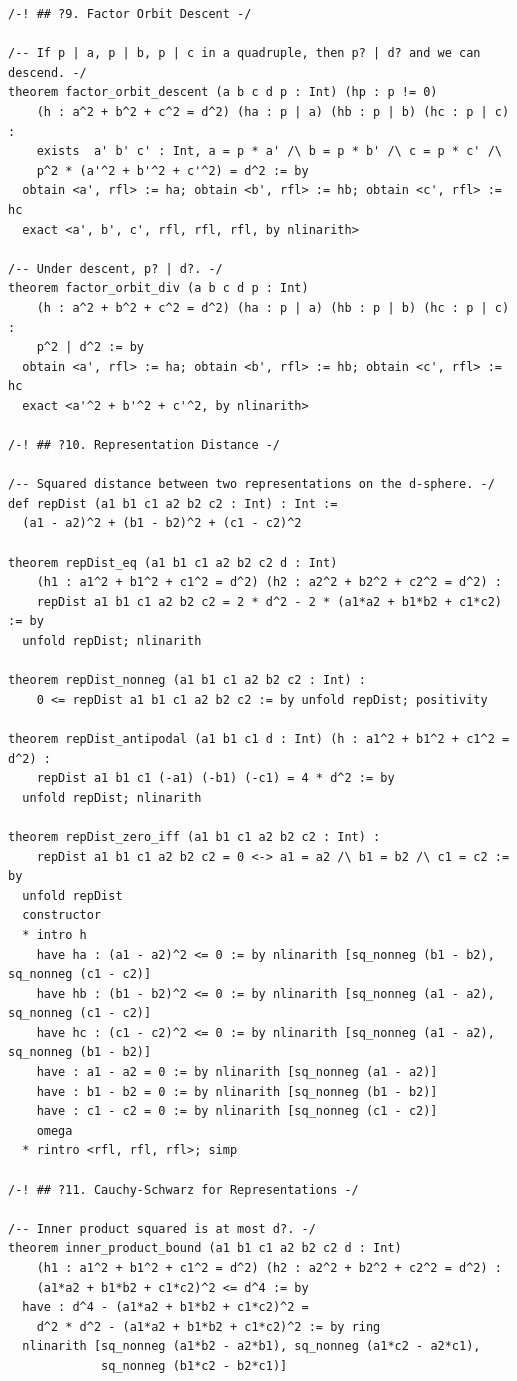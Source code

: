 \documentclass[11pt,twoside,openright]{book}
\theoremstyle{definition}
\theoremstyle{remark}
\begin{document}
\begin{lstlisting}[style=lean]
/-! ## ?9. Factor Orbit Descent -/

/-- If p | a, p | b, p | c in a quadruple, then p? | d? and we can descend. -/
theorem factor_orbit_descent (a b c d p : Int) (hp : p != 0)
    (h : a^2 + b^2 + c^2 = d^2) (ha : p | a) (hb : p | b) (hc : p | c) :
    exists  a' b' c' : Int, a = p * a' /\ b = p * b' /\ c = p * c' /\
    p^2 * (a'^2 + b'^2 + c'^2) = d^2 := by
  obtain <a', rfl> := ha; obtain <b', rfl> := hb; obtain <c', rfl> := hc
  exact <a', b', c', rfl, rfl, rfl, by nlinarith>

/-- Under descent, p? | d?. -/
theorem factor_orbit_div (a b c d p : Int)
    (h : a^2 + b^2 + c^2 = d^2) (ha : p | a) (hb : p | b) (hc : p | c) :
    p^2 | d^2 := by
  obtain <a', rfl> := ha; obtain <b', rfl> := hb; obtain <c', rfl> := hc
  exact <a'^2 + b'^2 + c'^2, by nlinarith>

/-! ## ?10. Representation Distance -/

/-- Squared distance between two representations on the d-sphere. -/
def repDist (a1 b1 c1 a2 b2 c2 : Int) : Int :=
  (a1 - a2)^2 + (b1 - b2)^2 + (c1 - c2)^2

theorem repDist_eq (a1 b1 c1 a2 b2 c2 d : Int)
    (h1 : a1^2 + b1^2 + c1^2 = d^2) (h2 : a2^2 + b2^2 + c2^2 = d^2) :
    repDist a1 b1 c1 a2 b2 c2 = 2 * d^2 - 2 * (a1*a2 + b1*b2 + c1*c2) := by
  unfold repDist; nlinarith

theorem repDist_nonneg (a1 b1 c1 a2 b2 c2 : Int) :
    0 <= repDist a1 b1 c1 a2 b2 c2 := by unfold repDist; positivity

theorem repDist_antipodal (a1 b1 c1 d : Int) (h : a1^2 + b1^2 + c1^2 = d^2) :
    repDist a1 b1 c1 (-a1) (-b1) (-c1) = 4 * d^2 := by
  unfold repDist; nlinarith

theorem repDist_zero_iff (a1 b1 c1 a2 b2 c2 : Int) :
    repDist a1 b1 c1 a2 b2 c2 = 0 <-> a1 = a2 /\ b1 = b2 /\ c1 = c2 := by
  unfold repDist
  constructor
  * intro h
    have ha : (a1 - a2)^2 <= 0 := by nlinarith [sq_nonneg (b1 - b2), sq_nonneg (c1 - c2)]
    have hb : (b1 - b2)^2 <= 0 := by nlinarith [sq_nonneg (a1 - a2), sq_nonneg (c1 - c2)]
    have hc : (c1 - c2)^2 <= 0 := by nlinarith [sq_nonneg (a1 - a2), sq_nonneg (b1 - b2)]
    have : a1 - a2 = 0 := by nlinarith [sq_nonneg (a1 - a2)]
    have : b1 - b2 = 0 := by nlinarith [sq_nonneg (b1 - b2)]
    have : c1 - c2 = 0 := by nlinarith [sq_nonneg (c1 - c2)]
    omega
  * rintro <rfl, rfl, rfl>; simp

/-! ## ?11. Cauchy-Schwarz for Representations -/

/-- Inner product squared is at most d?. -/
theorem inner_product_bound (a1 b1 c1 a2 b2 c2 d : Int)
    (h1 : a1^2 + b1^2 + c1^2 = d^2) (h2 : a2^2 + b2^2 + c2^2 = d^2) :
    (a1*a2 + b1*b2 + c1*c2)^2 <= d^4 := by
  have : d^4 - (a1*a2 + b1*b2 + c1*c2)^2 =
    d^2 * d^2 - (a1*a2 + b1*b2 + c1*c2)^2 := by ring
  nlinarith [sq_nonneg (a1*b2 - a2*b1), sq_nonneg (a1*c2 - a2*c1),
             sq_nonneg (b1*c2 - b2*c1)]


\end{lstlisting}
\end{document}
